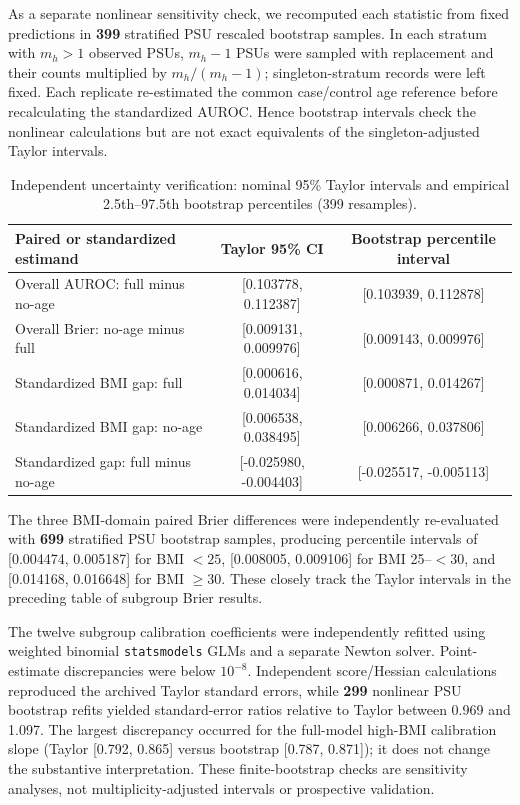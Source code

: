 As a separate nonlinear sensitivity check, we recomputed each statistic from fixed predictions in \textbf{399} stratified PSU rescaled bootstrap samples. In each stratum with $m_h>1$ observed PSUs, $m_h-1$ PSUs were sampled with replacement and their counts multiplied by $m_h/(m_h-1)$; singleton-stratum records were left fixed. Each replicate re-estimated the common case/control age reference before recalculating the standardized AUROC. Hence bootstrap intervals check the nonlinear calculations but are not exact equivalents of the singleton-adjusted Taylor intervals.
\begin{table}[htbp]\centering\caption{Independent uncertainty verification: nominal 95\% Taylor intervals and empirical 2.5th--97.5th bootstrap percentiles (399 resamples).}
{\footnotesize\setlength{\tabcolsep}{4pt}\begin{tabular}{lcc}\toprule
Paired or standardized estimand & Taylor 95\% CI & Bootstrap percentile interval \\\midrule
Overall AUROC: full minus no-age & [0.103778, 0.112387] & [0.103939, 0.112878] \\
Overall Brier: no-age minus full & [0.009131, 0.009976] & [0.009143, 0.009976] \\
Standardized BMI gap: full & [0.000616, 0.014034] & [0.000871, 0.014267] \\
Standardized BMI gap: no-age & [0.006538, 0.038495] & [0.006266, 0.037806] \\
Standardized gap: full minus no-age & [-0.025980, -0.004403] & [-0.025517, -0.005113] \\\bottomrule
\end{tabular}}\end{table}
The three BMI-domain paired Brier differences were independently re-evaluated with \textbf{699} stratified PSU bootstrap samples, producing percentile intervals of [0.004474, 0.005187] for BMI $<25$, [0.008005, 0.009106] for BMI 25--$<30$, and [0.014168, 0.016648] for BMI $\geq30$. These closely track the Taylor intervals in the preceding table of subgroup Brier results.

The twelve subgroup calibration coefficients were independently refitted using weighted binomial \texttt{statsmodels} GLMs and a separate Newton solver. Point-estimate discrepancies were below $10^{-8}$. Independent score/Hessian calculations reproduced the archived Taylor standard errors, while \textbf{299} nonlinear PSU bootstrap refits yielded standard-error ratios relative to Taylor between 0.969 and 1.097. The largest discrepancy occurred for the full-model high-BMI calibration slope (Taylor [0.792, 0.865] versus bootstrap [0.787, 0.871]); it does not change the substantive interpretation. These finite-bootstrap checks are sensitivity analyses, not multiplicity-adjusted intervals or prospective validation.

